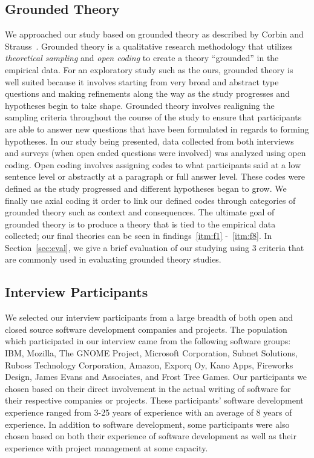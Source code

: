 \documentclass[conference]{IEEEtran}
\begin{document}
\subsection{Grounded Theory}
We approached our study based on grounded theory as described by Corbin and Strauss~\cite{Corbin:1998:SP}.
Grounded theory is a qualitative research methodology that utilizes \textit{theoretical sampling} and
\textit{open coding} to create a theory ``grounded'' in the empirical data. For an exploratory study such as
the ours, grounded theory is well suited because it involves starting from very broad and abstract type questions and
making refinements along the way as the study progresses and hypotheses begin to take shape. Grounded theory involves
realigning the sampling criteria throughout the course of the study to ensure that participants are able to answer new
questions that have been formulated in regards to forming hypotheses. In our study being presented, data collected from
both interviews and surveys (when open ended questions were involved) was analyzed using open coding. Open coding involves
assigning codes to what participants said at a low sentence level or abstractly at a paragraph or full answer level. These
codes were defined as the study progressed and different hypotheses began to grow. We finally use axial coding it order to
link our defined codes through categories of grounded theory such as context and consequences. The ultimate goal of grounded 
theory is to produce a theory that is tied to the empirical data collected; our final theories can be seen in
findings~\ref{itm:f1} -~\ref{itm:f8}. In Section~\ref{sec:eval}, we give a brief evaluation of our studying using 
3 criteria that are commonly used in evaluating grounded theory studies.

\subsection{Interview Participants}

We selected our interview participants from a large breadth of both open and closed source software development companies
and projects. The population which participated in our interview came from the following software groups: 
IBM, Mozilla, The GNOME Project, Microsoft Corporation, Subnet Solutions, Ruboss Technology Corporation, 
Amazon, Exporq Oy, Kano Apps, Fireworks Design, James Evans and Associates, and Frost Tree Games. 
Our participants we chosen based on their direct involvement in the actual writing of software for
their respective companies or projects. These participants' software development experience ranged from 3-25 years of experience
with an average of 8 years of experience.
In addition to software development, some participants were also chosen based on both their experience of software development 
as well as their experience with project management at some capacity.
\end{document}
